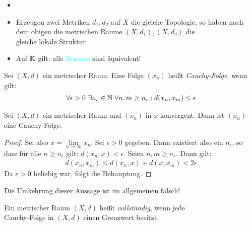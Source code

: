 \begin{Bemerkung}{
	\begin{itemize}
		\item[]
		\item Erzeugen zwei Metriken $d_1,d_2$ auf $X$ die gleiche Topologie, so 
		haben nach dem obigen die metrischen Räume $(X,d_1),(X,d_2)$ die \\
		\glqq gleiche lokale Struktur\grqq{}
		\item Auf $\mathbb{K}$ gilt: alle \textcolor{cyan}{Normen} sind äquivalent!
	\end{itemize}
}\end{Bemerkung}

\begin{Definition}{%
	Sei $(X,d)$ ein metrischer Raum. Eine Folge $(x_n)$ heißt  \emph{Cauchy-Folge}, 
	wenn gilt:
	\begin{align*}
		\forall \epsilon > 0 \text{ } \exists n_\epsilon \in \mathbb{N} \text{ }\forall n,m \geq n_\epsilon: 
		d(x_n,x_m) \leq \epsilon
	\end{align*}
}\end{Definition}

\begin{Proposition}{%
	Sei $(X,d)$ ein metrischer Raum und $(x_n)$ in $x$ konvergent. Dann ist $(x_n)$ 
	eine Cauchy-Folge.
}\end{Proposition}

\begin{proof}
	Sei also $x = \lim\limits_{n \rightarrow \infty}{x_n}$. Sei $\epsilon > 0$ 
	gegeben. Dann existiert also ein $n_\epsilon$, so dass für alle $n \geq n_\epsilon$ gilt: $d(x_n,x) < \epsilon$. Seien $n, m \geq n_\epsilon$. Dann gilt:
	\begin{align*}
		d(x_n,x_m) \leq d(x_n, x) + d(x,x_m) < 2 \epsilon
	\end{align*}
	Da $\epsilon >0$ beliebig war, folgt die Behauptung.
\end{proof}

\begin{Bemerkung}{
	Die Umkehrung dieser Aussage ist im allgemeinen falsch!
}\end{Bemerkung}

\begin{Definition}{%
	Ein metrischer Raum $(X,d)$ heißt \emph{vollständig}, wenn jede \\
	Cauchy-Folge in $(X,d)$ einen Grenzwert besitzt.
}\end{Definition}

